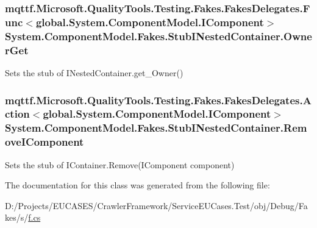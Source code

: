 \hypertarget{class_system_1_1_component_model_1_1_fakes_1_1_stub_i_nested_container_ae68cb0e42501f016d86a7463ebe4936e}{
\subsubsection[{Owner\-Get}]{\setlength{\rightskip}{0pt plus 5cm}mqttf.\-Microsoft.\-Quality\-Tools.\-Testing.\-Fakes.\-Fakes\-Delegates.\-Func$<$global.\-System.\-Component\-Model.\-I\-Component$>$ System.\-Component\-Model.\-Fakes.\-Stub\-I\-Nested\-Container.\-Owner\-Get}}\label{class_system_1_1_component_model_1_1_fakes_1_1_stub_i_nested_container_ae68cb0e42501f016d86a7463ebe4936e}


Sets the stub of I\-Nested\-Container.\-get\-\_\-\-Owner()

\hypertarget{class_system_1_1_component_model_1_1_fakes_1_1_stub_i_nested_container_a32ef63a3f0bb44366300ccfa69134c76}{
\subsubsection[{Remove\-I\-Component}]{\setlength{\rightskip}{0pt plus 5cm}mqttf.\-Microsoft.\-Quality\-Tools.\-Testing.\-Fakes.\-Fakes\-Delegates.\-Action$<$global.\-System.\-Component\-Model.\-I\-Component$>$ System.\-Component\-Model.\-Fakes.\-Stub\-I\-Nested\-Container.\-Remove\-I\-Component}}\label{class_system_1_1_component_model_1_1_fakes_1_1_stub_i_nested_container_a32ef63a3f0bb44366300ccfa69134c76}


Sets the stub of I\-Container.\-Remove(\-I\-Component component)



The documentation for this class was generated from the following file\-:\begin{DoxyCompactItemize}
\item 
D\-:/\-Projects/\-E\-U\-C\-A\-S\-E\-S/\-Crawler\-Framework/\-Service\-E\-U\-Cases.\-Test/obj/\-Debug/\-Fakes/s/\hyperlink{s_2f_8cs}{f.\-cs}\end{DoxyCompactItemize}
